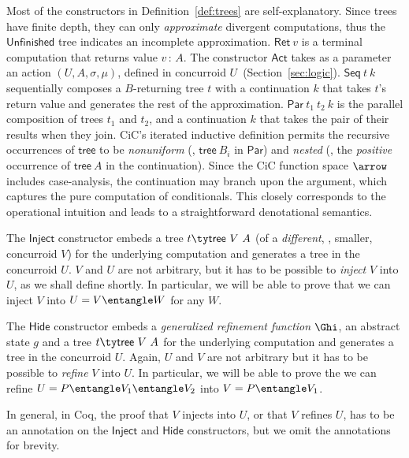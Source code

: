 Most of the constructors in Definition~\ref{def:trees} are
self-explanatory.
%
Since trees have finite depth, they can only \emph{approximate}
divergent computations, thus the $\mathsf{Unfinished}$ tree indicates
an incomplete approximation. %
%
$\mathsf{Ret}\ v$ is a terminal computation that returns value
$v\,{:}\,A$. %
%
The constructor $\mathsf{Act}$ takes as a parameter an action $(U, A,
\sigma, \mu)$, defined in concurroid $U$~(Section~\ref{sec:logic}).
%
$ \mathsf{Seq}~t~k$ sequentially composes a $B$-returning tree $t$
with a continuation $k$ that takes $t$'s return value and generates
the rest of the approximation.
%
$\mathsf{Par}\ t_1\ t_2\ k$ is the parallel composition of trees $t_1$
and $t_2$, and a continuation $k$ that takes the pair of their results
when they join. %
CiC's iterated inductive definition permits the recursive occurrences
of $\mathsf{tree}$ to be \emph{nonuniform} (\eg, $\mathsf{tree}\ B_i$
in $\mathsf{Par}$) and \emph{nested} (\eg, the \emph{positive}
occurrence of $\mathsf{tree}\ A$ in the continuation). %
Since the CiC function space $\arrow$ includes case-analysis, the
continuation may branch upon the argument, which captures the pure
computation of conditionals. %
This closely corresponds to the operational intuition and leads to a
straightforward denotational semantics.
%

The $\mathsf{Inject}$ constructor embeds a tree $t \ty
\mathsf{tree}~V~A$ (of a \emph{different}, \ie, smaller, concurroid
$V$) for the underlying computation and generates a tree in the
concurroid $U$.  $V$ and $U$ are not arbitrary, but it has to be
possible to \emph{inject} $V$ into $U$, as we shall define shortly.
In particular, we will be able to prove that we can inject $V$ into $U
= V \entangle W$ for any $W$. 

%
The $\mathsf{Hide}$ constructor embeds a \emph{generalized refinement
  function} $\Ghi$, an abstract state $g$ and a tree $t \ty
\mathsf{tree}~V~A$ for the underlying computation and generates a tree
in the concurroid $U$. Again, $U$ and $V$ are not arbitrary but it has
to be possible to \emph{refine} $V$ into $U$. In particular, we will
be able to prove the we can refine $U = P \entangle V_1 \entangle V_2$
into $V = P \entangle V_1$.

In general, in Coq, the proof that $V$ injects into $U$, or that $V$
refines $U$, has to be an annotation on the $\mathsf{Inject}$ and
$\mathsf{Hide}$ constructors, but we omit the annotations for brevity.



